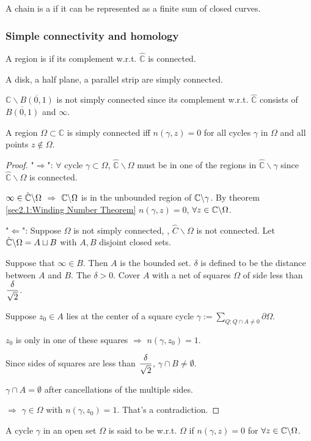 
A chain is a  if it can be represented as a finite sum of closed curves.
\subsubsection{Simple connectivity and homology}
A region is  if its complement w.r.t.  $ \hat{\mathbb C} $ is connected.
\begin{example}
    A disk, a half plane, a parallel strip are simply connected.

     $ \mathbb{C}\backslash \overline{B(0,1)} $ is not simply connected since its complement w.r.t.  $ \hat{\mathbb C} $ consists of  $ \overline{B(0,1)} $ and  $ \infty $.    
\end{example} 
\begin{theorem}\label{thm in sec:4.2: Equivalence of simply connectness}
    A region  $ \Omega\subset \mathbb C $ is simply connected iff $ n(\gamma,z)=0 $ for all cycles  $ \gamma  $ in  $ \Omega  $ and all points  $ z\not\in \Omega $.   
\end{theorem}
\begin{proof}
    "$\Rightarrow$":
    $ \forall   $ cycle  $ \gamma\subset \Omega $,  $ \hat{\mathbb{C}}\backslash \Omega$ must be in one of the regions in  $ \hat{\mathbb C}\backslash\gamma $ since  $ \hat{\mathbb C}\backslash \Omega $  is connected.
    
    $ \infty\in \hat{\mathbb C}\backslash\Omega $ $ \Rightarrow  $  $ \mathbb C\backslash\Omega  $ is in the unbounded region of  $ \mathbb C\backslash \gamma $.  By theorem \ref{sec2.1:Winding Number Theorem}  $ n(\gamma,z)=0 $, $ \forall z\in \mathbb C\backslash\Omega $.
    
    "$ \Leftarrow $": Suppose  $ \Omega  $ is not simply connected, \ie,  $ \hat{C}\backslash\Omega $ is not connected. Let  $ \hat{\mathbb C}\backslash \Omega=A\sqcup B $ with  $ A,B $ disjoint closed sets.
    
    Suppose that  $ \infty\in B $. Then  $ A  $ is the bounded set. $ \delta $ is defined to be the distance between  $ A  $ and  $ B $. The  $ \delta>0 $. Cover  $ A  $ with a net of squares  $ \Omega $   of side less than  $ \displaystyle\frac{\delta}{\sqrt{2}} $.
    
    Suppose  $ z_0\in A  $ lies at the center of a square cycle  $ \gamma:=\sum\limits_{Q:Q\cap A\neq 0}\partial \Omega $.
    
    $ z_0  $ is only in one of these squares  $ \Rightarrow  $ $ n(\gamma,z_0)=1 $.
    
    Since sides of squares are less than  $ \displaystyle\frac{\delta }{\sqrt{2}} $,  $ \gamma\cap B\neq \emptyset $.
    
     $ \gamma\cap A=\emptyset $ after  cancellations of the multiple sides.
     
     $ \Rightarrow  $  $ \gamma\in \Omega $ with  $ n(\gamma,z_0)=1 $. That's a contradiction. 
\end{proof}
A cycle $ \gamma    $ in an open set  $ \Omega  $ is said to be  w.r.t.  $ \Omega  $ if  $ n(\gamma,z)=0  $ for  $ \forall z\in\mathbb C\backslash \Omega $. 

